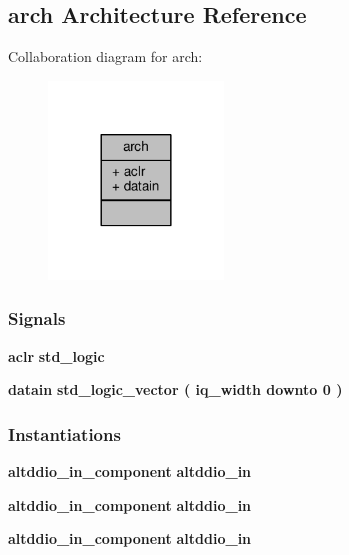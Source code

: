 \subsection{arch Architecture Reference}
\label{classlms7002__ddin_1_1arch}


Collaboration diagram for arch\+:\nopagebreak
\begin{figure}[H]
\begin{center}
\leavevmode
\includegraphics[width=132pt]{dc/d60/classlms7002__ddin_1_1arch__coll__graph}
\end{center}
\end{figure}
\subsubsection*{Signals}
 \begin{DoxyCompactItemize}
\item 
{\bf aclr} {\bfseries \textcolor{comment}{std\+\_\+logic}\textcolor{vhdlchar}{ }} 
\item 
{\bf datain} {\bfseries \textcolor{comment}{std\+\_\+logic\+\_\+vector}\textcolor{vhdlchar}{ }\textcolor{vhdlchar}{(}\textcolor{vhdlchar}{ }\textcolor{vhdlchar}{ }\textcolor{vhdlchar}{ }\textcolor{vhdlchar}{ }{\bfseries {\bf iq\+\_\+width}} \textcolor{vhdlchar}{ }\textcolor{keywordflow}{downto}\textcolor{vhdlchar}{ }\textcolor{vhdlchar}{ } \textcolor{vhdldigit}{0} \textcolor{vhdlchar}{ }\textcolor{vhdlchar}{)}\textcolor{vhdlchar}{ }} 
\end{DoxyCompactItemize}
\subsubsection*{Instantiations}
 \begin{DoxyCompactItemize}
\item 
{\bf altddio\+\_\+in\+\_\+component}  {\bfseries altddio\+\_\+in}   
\item 
{\bf altddio\+\_\+in\+\_\+component}  {\bfseries altddio\+\_\+in}   
\item 
{\bf altddio\+\_\+in\+\_\+component}  {\bfseries altddio\+\_\+in}   
\end{DoxyCompactItemize}


